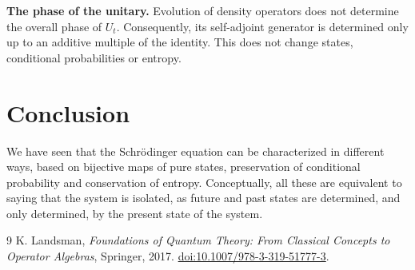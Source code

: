\documentclass{techbrief}
\begin{document}
\textbf{The phase of the unitary.} Evolution of density operators does not determine the overall phase of $U_t$. Consequently, its self-adjoint generator is determined only up to an additive multiple of the identity. This does not change states, conditional probabilities or entropy.

\section{Conclusion}

We have seen that the Schrödinger equation can be characterized in different ways, based on bijective maps of pure states, preservation of conditional probability and conservation of entropy. Conceptually, all these are equivalent to saying that the system is isolated, as future and past states are determined, and only determined, by the present state of the system.

\begin{thebibliography}{9}
	K. Landsman, \emph{Foundations of Quantum Theory: From Classical Concepts to Operator Algebras}, Springer, 2017.
	\href{https://doi.org/10.1007/978-3-319-51777-3}{doi:10.1007/978-3-319-51777-3}.
\end{thebibliography}
\end{document}
